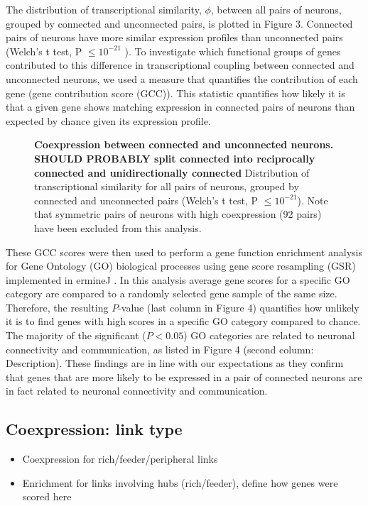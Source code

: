 \documentclass[10pt,letterpaper]{article}
\begin{document}
The distribution of transcriptional similarity, $\phi$, between all pairs of neurons, grouped by connected and unconnected pairs, is plotted in Figure 3.
Connected pairs of neurons have more similar expression profiles than unconnected pairs (Welch's t test, P $ \leq 10^{-21}$ ). To investigate which functional groups of genes contributed to this difference in transcriptional coupling between connected and unconnected neurons, we used a measure that quantifies the contribution of each gene (gene contribution score (GCC)).
This statistic quantifies how likely it is that a given gene shows matching expression in connected pairs of neurons than expected by chance given its expression profile.

 \begin{figure}[!h]
 \caption{{\bf Coexpression between connected and unconnected neurons. SHOULD PROBABLY split connected into reciprocally connected and unidirectionally connected}
Distribution of transcriptional similarity for all pairs of neurons, grouped by connected and unconnected pairs (Welch’s t test, P $ \leq 10^{-21}$). Note that symmetric pairs of neurons with high coexpression (92 pairs) have been excluded from this analysis.}
 \label{ConUnconChemical}
 \end{figure}

These GCC scores were then used to perform a gene function enrichment analysis for Gene Ontology (GO) biological processes using gene score resampling (GSR) implemented in ermineJ \cite{Gillis2010}.
In this analysis average gene scores for a specific GO category are compared to a randomly selected gene sample of the same size.
Therefore, the resulting $P$-value (last column in Figure 4) quantifies how unlikely it is to find genes with high scores in a specific GO category compared to chance.
The majority of the significant ($P < 0.05$) GO categories are related to neuronal connectivity and communication, as listed in Figure 4 (second column: Description).
These findings are in line with our expectations as they confirm that genes that are more likely to be expressed in a pair of connected neurons are in fact related to neuronal connectivity and communication.

\subsection*{Coexpression: link type}
\begin{itemize}
    \item{Coexpression for rich/feeder/peripheral links}
    \item{Enrichment for links involving hubs (rich/feeder), define how genes were scored here}
\end{itemize} 
\end{document}
